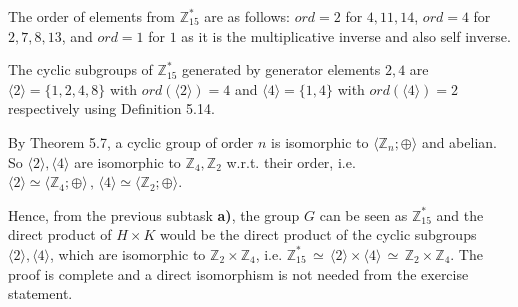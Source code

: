 \documentclass[unicode,11pt,a4paper,oneside,numbers=endperiod,openany]{scrartcl}
\def\Z{\mathbb{Z}}
\newcommand{\Zgmult}[1]{\mathbb{Z}_{#1}^{\ast}}
\begin{document}
The order of elements from \( \Z^{\ast}_{15} \) are as follows:
\( ord = 2 \) for \( 4, 11, 14 \),
\( ord = 4 \) for \( 2, 7, 8, 13 \),
and \( ord = 1 \) for \( 1 \) as it is the multiplicative inverse and also self inverse.

The cyclic subgroups of \( \Zgmult{15} \) generated by generator elements \( 2, 4 \) 
are \( \langle 2 \rangle = \{ 1, 2, 4, 8 \} \) with \( ord( \langle 2 \rangle ) = 4\) 
and \( \langle 4 \rangle = \{ 1, 4 \} \) with \( ord( \langle 4 \rangle ) = 2 \) respectively
using Definition 5.14.

By Theorem 5.7, a cyclic group of order \( n \) is isomorphic to \( \langle \Z_n ; \oplus \rangle \) 
and abelian.
So \( \langle 2 \rangle, \langle 4 \rangle \) are isomorphic to \( \Z_4, \Z_2 \) w.r.t. their order,
i.e. \( \langle 2 \rangle \simeq \langle \Z_4; \oplus \rangle 
\,, \, \langle 4 \rangle \simeq \langle \Z_2 ; \oplus \rangle \). 

Hence, from the previous subtask \textbf{a)},
the group \( G \) can be seen as \( \Zgmult{15} \) and the direct product of \( H \times K \)
would be the direct product of the cyclic subgroups
\( \langle 2 \rangle, \langle 4 \rangle \), which are isomorphic to \( \Z_2 \times \Z_4 \),
i.e. \( \Zgmult{15} \, \simeq \, \langle 2 \rangle \times \langle 4 \rangle \, \simeq \, \Z_2 \times \Z_4 \).
The proof is complete and a direct isomorphism is not needed from the exercise statement.
\end{document}
